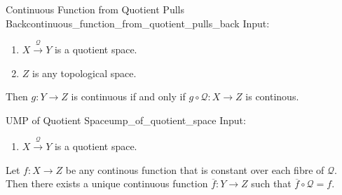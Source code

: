 \documentclass{article}
\begin{document}
\begin{lemma}{Continuous Function from Quotient Pulls Back}{continuous_function_from_quotient_pulls_back}
    Input:
    \begin{enumerate}
        \item $X\xrightarrow{\mathcal{Q}} Y$ is a quotient space.
        \item $Z$ is any topological space.
    \end{enumerate}
    Then $g:Y\rightarrow Z$ is continuous if and only if $g\circ \mathcal{Q}: X\rightarrow Z$ is continous.
\end{lemma}

\begin{lemma}{UMP of Quotient Space}{ump_of_quotient_space}
    Input:
    \begin{enumerate}
        \item $X\xrightarrow{\mathcal{Q}} Y$ is a quotient space.
    \end{enumerate}
    Let $f:X\rightarrow Z$ be any continous function that is constant over each fibre of $\mathcal{Q}$.
    Then there exists a unique continuous function $\overline{f}:Y\rightarrow Z$ such that $\overline{f}\circ\mathcal{Q} = f$.
    \begin{center}
    \end{center}
\end{lemma}

% 
% 
\end{document}
